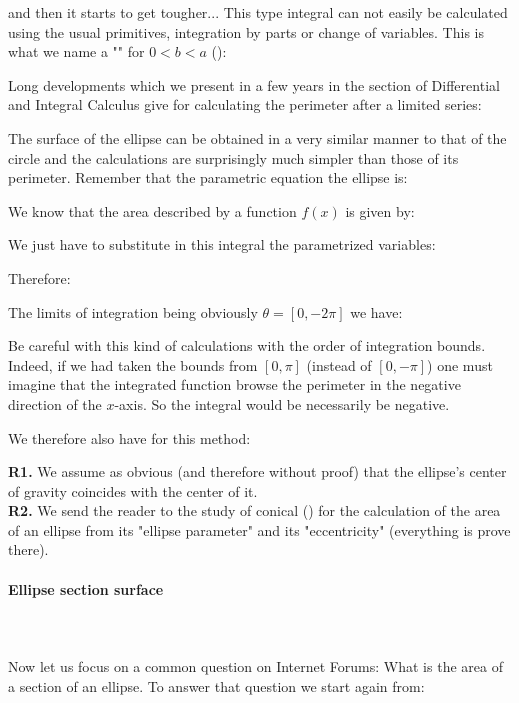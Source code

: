 {	and then it starts to get tougher... This type integral can not easily be calculated using the usual primitives, integration by parts or change of variables. This is what we name a "" for $0<b<a$ ():
	
	Long developments which we present in a few years in the section of Differential and Integral Calculus give for calculating the perimeter after a limited series:
	
	The surface of the ellipse can be obtained in a very similar manner to that of the circle and the calculations are surprisingly much simpler than those of its perimeter. Remember that the parametric equation the ellipse is:
	
	We know that the area described by a function $f(x)$ is given by:
	
	We just have to substitute in this integral the parametrized variables:
	
	Therefore:
	
	The limits of integration being obviously $\theta=[0,-2\pi]$ we have:
	
	\begin{tcolorbox}[title=Remark,colframe=black,arc=10pt]
	Be careful with this kind of calculations with the order of integration bounds. Indeed, if we had taken the bounds from $[0,\pi]$ (instead of $[0,-\pi]$) one must imagine that the integrated function browse the perimeter in the negative direction of the $x$-axis. So the integral would be necessarily be negative.
	\end{tcolorbox}
	We therefore also have for this method:
	
	\begin{tcolorbox}[title=Remarks,colframe=black,arc=10pt]
	\textbf{R1.} We assume as obvious (and therefore without proof) that the ellipse's center of gravity coincides with the center of it.\\
	
	\textbf{R2.} We send the reader to the study of conical () for the calculation of the area of an ellipse from its "ellipse parameter" and its "eccentricity" (everything is prove there).
	\end{tcolorbox}	
	
	\paragraph{Ellipse section surface}\mbox{}\\\\			
	Now let us focus on a common question on Internet Forums: What is the area of a section of an ellipse. To answer that question we start again from:
	
}
